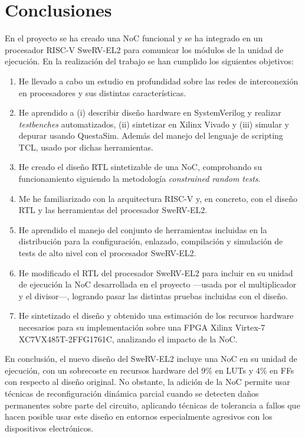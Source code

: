 \chapter{Conclusiones}

En el proyecto se ha creado una NoC funcional y se ha integrado en un procesador \mbox{RISC-V} \mbox{SweRV-EL2} para comunicar los módulos de la unidad de ejecución. En la realización del trabajo se han cumplido los siguientes objetivos:

\begin{enumerate}[noitemsep]
    \item He llevado a cabo un estudio en profundidad sobre las redes de interconexión en procesadores y sus distintas características.
    \item He aprendido a (i) describir diseño hardware en SystemVerilog y realizar \textit{testbenches} automatizados, (ii) sintetizar en Xilinx Vivado y (iii) simular y depurar usando \mbox{QuestaSim}. Además del manejo del lenguaje de scripting TCL, usado por dichas herramientas.
    \item He creado el diseño RTL sintetizable de una NoC, comprobando su funcionamiento siguiendo la metodología \textit{constrained random tests}.
    \item Me he familiarizado con la arquitectura RISC-V y, en concreto, con el diseño RTL y las herramientas del procesador SweRV-EL2.
    \item He aprendido el manejo del conjunto de herramientas incluidas en la distribución para la configuración, enlazado, compilación y simulación de tests de alto nivel con el procesador SweRV-EL2.
    \item He modificado el RTL del procesador SweRV-EL2 para incluir en su unidad de ejecución la NoC desarrollada en el proyecto ---usada por el multiplicador y el divisor---, logrando pasar las distintas pruebas incluidas con el diseño.
    \item He sintetizado el diseño y obtenido una estimación de los recursos hardware necesarios para su implementación sobre una FPGA Xilinx Virtex-7 XC7VX485T-2FFG1761C, analizando el impacto de la NoC.
\end{enumerate}

En conclusión, el nuevo diseño del SweRV-EL2 incluye una NoC en su unidad de ejecución, con un sobrecoste en recursos hardware del 9\% en LUTs y 4\% en FFs con respecto al diseño original. 
No obstante, la adición de la NoC permite usar técnicas de reconfiguración dinámica parcial cuando se detecten daños permanentes sobre parte del circuito, aplicando técnicas de tolerancia a fallos que hacen posible usar este diseño en entornos especialmente agresivos con los dispositivos electrónicos.

